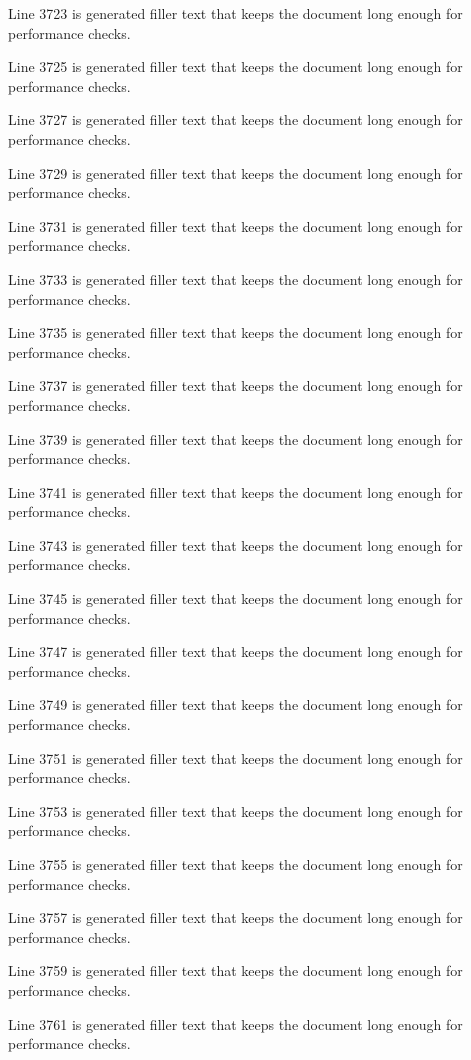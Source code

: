 Line 3723 is generated filler text that keeps the document long enough for performance checks.

Line 3725 is generated filler text that keeps the document long enough for performance checks.

Line 3727 is generated filler text that keeps the document long enough for performance checks.

Line 3729 is generated filler text that keeps the document long enough for performance checks.

Line 3731 is generated filler text that keeps the document long enough for performance checks.

Line 3733 is generated filler text that keeps the document long enough for performance checks.

Line 3735 is generated filler text that keeps the document long enough for performance checks.

Line 3737 is generated filler text that keeps the document long enough for performance checks.

Line 3739 is generated filler text that keeps the document long enough for performance checks.

Line 3741 is generated filler text that keeps the document long enough for performance checks.

Line 3743 is generated filler text that keeps the document long enough for performance checks.

Line 3745 is generated filler text that keeps the document long enough for performance checks.

Line 3747 is generated filler text that keeps the document long enough for performance checks.

Line 3749 is generated filler text that keeps the document long enough for performance checks.

Line 3751 is generated filler text that keeps the document long enough for performance checks.

Line 3753 is generated filler text that keeps the document long enough for performance checks.

Line 3755 is generated filler text that keeps the document long enough for performance checks.

Line 3757 is generated filler text that keeps the document long enough for performance checks.

Line 3759 is generated filler text that keeps the document long enough for performance checks.

Line 3761 is generated filler text that keeps the document long enough for performance checks.

